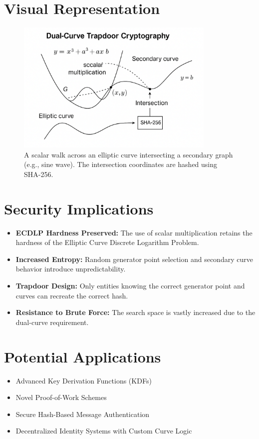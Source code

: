 \documentclass{article}
\begin{document}
\section{Visual Representation}
\begin{figure}[H]
\centering
\includegraphics[width=0.85\textwidth]{dual_curve_graph.png}
\caption{A scalar walk across an elliptic curve intersecting a secondary graph (e.g., sine wave). The intersection coordinates are hashed using SHA-256.}
\end{figure}

\section{Security Implications}
\begin{itemize}
  \item \textbf{ECDLP Hardness Preserved:} The use of scalar multiplication retains the hardness of the Elliptic Curve Discrete Logarithm Problem.
  \item \textbf{Increased Entropy:} Random generator point selection and secondary curve behavior introduce unpredictability.
  \item \textbf{Trapdoor Design:} Only entities knowing the correct generator point and curves can recreate the correct hash.
  \item \textbf{Resistance to Brute Force:} The search space is vastly increased due to the dual-curve requirement.
\end{itemize}

\section{Potential Applications}
\begin{itemize}
  \item Advanced Key Derivation Functions (KDFs)
  \item Novel Proof-of-Work Schemes
  \item Secure Hash-Based Message Authentication
  \item Decentralized Identity Systems with Custom Curve Logic
\end{itemize}
\end{document}
